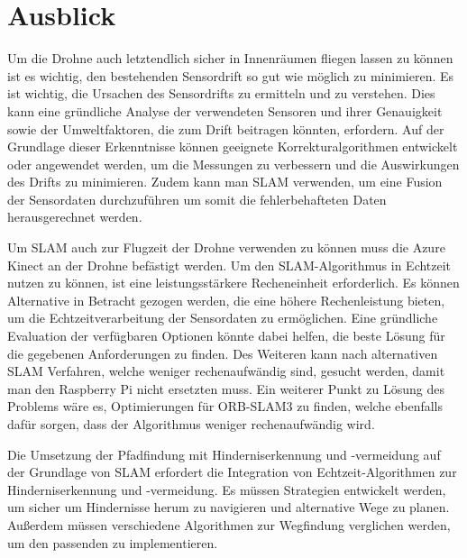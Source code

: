 \section{Ausblick}
Um die Drohne auch letztendlich sicher in Innenräumen fliegen lassen zu können ist es wichtig, den bestehenden Sensordrift so gut wie möglich zu minimieren. Es ist wichtig, die Ursachen des Sensordrifts zu ermitteln und zu verstehen. Dies kann eine gründliche Analyse der verwendeten Sensoren und ihrer Genauigkeit sowie der Umweltfaktoren, die zum Drift beitragen könnten, erfordern. Auf der Grundlage dieser Erkenntnisse können geeignete Korrekturalgorithmen entwickelt oder angewendet werden, um die Messungen zu verbessern und die Auswirkungen des Drifts zu minimieren. Zudem kann man SLAM verwenden, um eine Fusion der Sensordaten durchzuführen um somit die fehlerbehafteten Daten herausgerechnet werden. 

Um SLAM auch zur Flugzeit der Drohne verwenden zu können muss die Azure Kinect an der Drohne befästigt werden.
Um den SLAM-Algorithmus in Echtzeit nutzen zu können, ist eine leistungsstärkere Recheneinheit erforderlich. Es können Alternative in Betracht gezogen werden, die eine höhere Rechenleistung bieten, um die Echtzeitverarbeitung der Sensordaten zu ermöglichen. Eine gründliche Evaluation der verfügbaren Optionen könnte dabei helfen, die beste Lösung für die gegebenen Anforderungen zu finden. Des Weiteren kann nach alternativen SLAM Verfahren, welche weniger rechenaufwändig sind, gesucht werden, damit man den Raspberry Pi nicht ersetzten muss. Ein weiterer Punkt zu Lösung des Problems wäre es, Optimierungen für ORB-SLAM3 zu finden, welche ebenfalls dafür sorgen, dass der Algorithmus weniger rechenaufwändig wird. 

Die Umsetzung der Pfadfindung mit Hinderniserkennung und -vermeidung auf der Grundlage von SLAM erfordert die Integration von Echtzeit-Algorithmen zur Hinderniserkennung und -vermeidung. Es müssen Strategien entwickelt werden, um sicher um Hindernisse herum zu navigieren und alternative Wege zu planen. Außerdem müssen verschiedene Algorithmen zur Wegfindung verglichen werden, um den passenden zu implementieren.